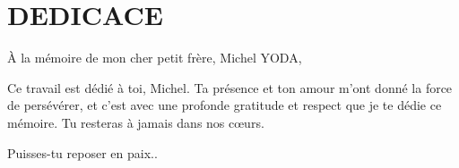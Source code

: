 \chapter*{DEDICACE}
\thispagestyle{MyStyle}
%
\begin{center}
{\huge À} la mémoire de mon cher petit frère, Michel YODA,

Ce travail est dédié à toi, Michel. 
Ta présence et ton amour m'ont donné la force de persévérer, et c'est avec une profonde gratitude et respect que je te dédie ce mémoire. Tu resteras à jamais dans nos cœurs.

Puisses-tu reposer en paix.. 
\end{center}
\nopagebreak{%
  \raggedright\hspace{5.75cm} 
  \vspace{-2cm}
 
  \raggedleft\normalfont\large\itshape{} \reportAuthor\par%
}
